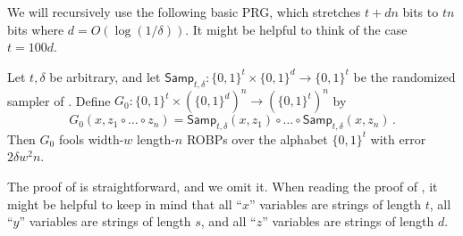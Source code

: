 We will recursively use the following basic PRG, which stretches $t + dn$ bits to $tn$ bits where $d = O(\log(1/\delta))$. It might be helpful to think of the case $t = 100 d$.

\begin{lemma} \label{lem:samp-prg}
Let $t, \delta$ be arbitrary, and let $\mathsf{Samp}_{t, \delta} \colon \{0, 1\}^t \times \{0, 1\}^d \to \{0, 1\}^t$ be the randomized sampler of . Define $G_0 \colon \{0, 1\}^t \times (\{0, 1\}^d)^n \to (\{0, 1\}^t)^n$ by
$$
G_0(x, z_1 \circ \dots \circ z_n) = \mathsf{Samp}_{t, \delta}(x, z_1) \circ \dots \circ \mathsf{Samp}_{t, \delta}(x, z_n)\,.
$$
Then $G_0$ fools width-$w$ length-$n$ ROBPs over the alphabet $\{0, 1\}^t$ with error $2\delta w^2 n$.
\end{lemma}

The proof of  is straightforward, and we omit it. When reading the proof of , it might be helpful to keep in mind that all ``$x$'' variables are strings of length $t$, all ``$y$'' variables are strings of length $s$, and all ``$z$'' variables are strings of length $d$.

